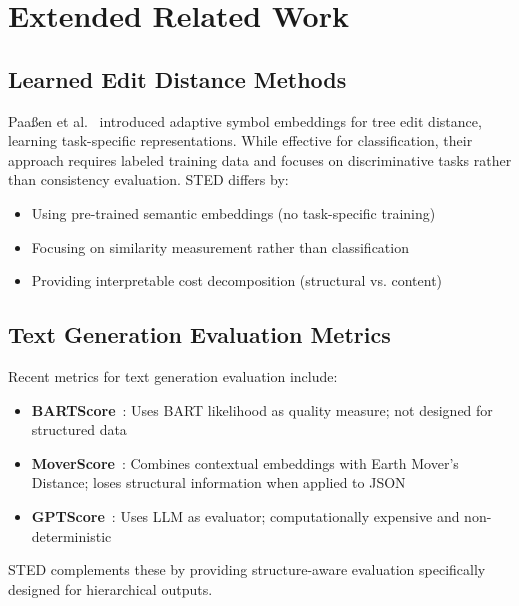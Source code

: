 \documentclass{article}
\begin{document}
\section{Extended Related Work}


\subsection{Learned Edit Distance Methods}

Paaßen et al.~\cite{paassen2018tree} introduced adaptive symbol embeddings for tree edit distance, learning task-specific representations. While effective for classification, their approach requires labeled training data and focuses on discriminative tasks rather than consistency evaluation. STED differs by:
\begin{itemize}
    \item Using pre-trained semantic embeddings (no task-specific training)
    \item Focusing on similarity measurement rather than classification
    \item Providing interpretable cost decomposition (structural vs. content)
\end{itemize}

\subsection{Text Generation Evaluation Metrics}

Recent metrics for text generation evaluation include:
\begin{itemize}
    \item \textbf{BARTScore}~\cite{yuan2021bartscore}: Uses BART likelihood as quality measure; not designed for structured data
    \item \textbf{MoverScore}~\cite{zhao2019moverscore}: Combines contextual embeddings with Earth Mover's Distance; loses structural information when applied to JSON
    \item \textbf{GPTScore}~\cite{fu2023gptscore}: Uses LLM as evaluator; computationally expensive and non-deterministic
\end{itemize}

STED complements these by providing structure-aware evaluation specifically designed for hierarchical outputs.
\end{document}
